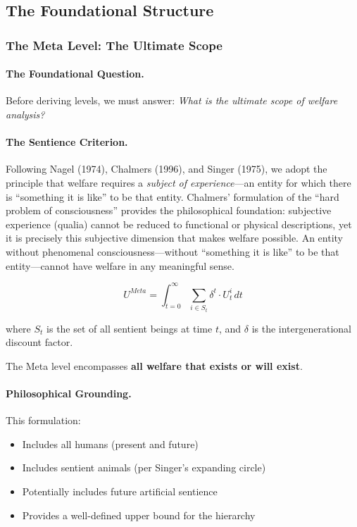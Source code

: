 \subsection{The Foundational Structure}

\subsubsection{The Meta Level: The Ultimate Scope}

\paragraph{The Foundational Question.}
Before deriving levels, we must answer: \textit{What is the ultimate scope of 
welfare analysis?}

\paragraph{The Sentience Criterion.}
Following Nagel (1974), Chalmers (1996), and Singer (1975), we adopt the principle 
that welfare requires a \textit{subject of experience}---an entity for which there 
is ``something it is like'' to be that entity. Chalmers' formulation of the 
``hard problem of consciousness'' provides the philosophical foundation: subjective 
experience (qualia) cannot be reduced to functional or physical descriptions, yet 
it is precisely this subjective dimension that makes welfare possible. An entity 
without phenomenal consciousness---without ``something it is like'' to be that 
entity---cannot have welfare in any meaningful sense.

\begin{tcolorbox}[colback=green!5!white, colframe=green!50!black, title=Definition: The Meta Level]
\begin{equation}
\boxed{
U^{Meta} = \int_{t=0}^{\infty} \sum_{i \in S_t} \delta^t \cdot U^i_t \, dt
}
\end{equation}

where $S_t$ is the set of all sentient beings at time $t$, and $\delta$ is the 
intergenerational discount factor.

The Meta level encompasses \textbf{all welfare that exists or will exist}.
\end{tcolorbox}

\paragraph{Philosophical Grounding.}
This formulation:
\begin{itemize}
\item Includes all humans (present and future)
\item Includes sentient animals (per Singer's expanding circle)
\item Potentially includes future artificial sentience
\item Provides a well-defined upper bound for the hierarchy
\end{itemize}

